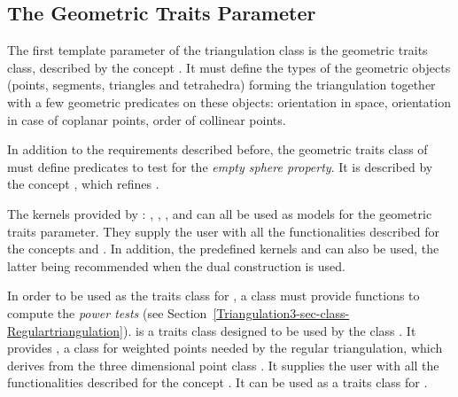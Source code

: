 \subsection{The Geometric Traits Parameter\label{Triangulation3-sec-Traits}}

The first template parameter of the triangulation class
is the geometric traits class, described by the concept
.  It must define the types of the geometric objects
(points, segments, triangles and tetrahedra) forming the triangulation together
with a few geometric predicates on these objects: orientation in space,
orientation in case of coplanar points, order of collinear points.

In addition to the requirements described before, the geometric traits
class of  must define predicates to test for the
\textit{empty sphere property}.  It is described by the concept
, which refines .

The kernels provided by \cgal: , ,
,  and
 can all be used as models for the geometric traits
parameter.
They supply the user with all the functionalities described for the concepts
 and
.
In addition, the predefined kernels
 and
can also be used, the latter being recommended when the dual construction is
used.

In order to be used as the traits class for ,
a class must provide functions to compute the \textit{power tests}
(see Section~\ref{Triangulation3-sec-class-Regulartriangulation}).
 is a traits class 
 designed to be used by the class
. It provides
, a class for weighted points
needed by the regular triangulation, which derives from the three dimensional
point class .
It supplies the user with all the functionalities 
described for the concept . 
It can be used as a traits class for
.

